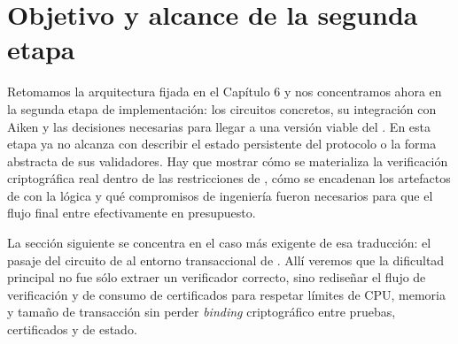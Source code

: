 


\section{Objetivo y alcance de la segunda etapa}

Retomamos la arquitectura fijada en el Cap\'itulo 6 y nos concentramos ahora en la segunda etapa de implementaci\'on: los circuitos \ZK concretos, su integraci\'on con Aiken y las decisiones necesarias para llegar a una versi\'on viable del \zkBridge. En esta etapa ya no alcanza con describir el estado persistente del protocolo o la forma abstracta de sus validadores. Hay que mostrar c\'omo se materializa la verificaci\'on criptogr\'afica real dentro de las restricciones de \Cardano, c\'omo se encadenan los artefactos de \Mithril con la l\'ogica \Onchain y qu\'e compromisos de ingenier\'ia fueron necesarios para que el flujo final entre efectivamente en presupuesto.

La secci\'on siguiente se concentra en el caso m\'as exigente de esa traducci\'on: el pasaje del circuito \HaloTwo de \Mithril al entorno transaccional de \Cardano. All\'i veremos que la dificultad principal no fue s\'olo extraer un verificador correcto, sino redise\~nar el flujo de verificaci\'on y de consumo de certificados para respetar l\'imites de CPU, memoria y tama\~no de transacci\'on sin perder \textit{binding} criptogr\'afico entre pruebas, certificados y \UTxOs de estado.





